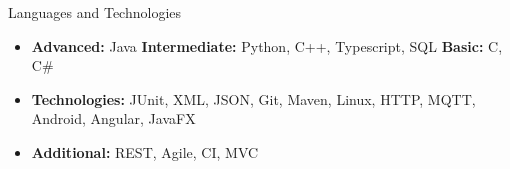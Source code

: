 \documentclass[]{style}
\begin{document}
	\begin{cvsection}{Languages and Technologies}
		\begin{cvsubsection}{}{}{}	
			\begin{itemize}
				\item \textbf{Advanced:} Java \textbf{Intermediate:} Python, C++, Typescript, SQL \textbf{Basic:} C, C\# 
				\item \textbf{Technologies:} JUnit, XML, JSON, Git, Maven, Linux, HTTP, MQTT, Android, Angular, JavaFX
				\item \textbf{Additional:} REST, Agile, CI, MVC
			\end{itemize}
		\end{cvsubsection}
	\end{cvsection}
	
\end{document}
